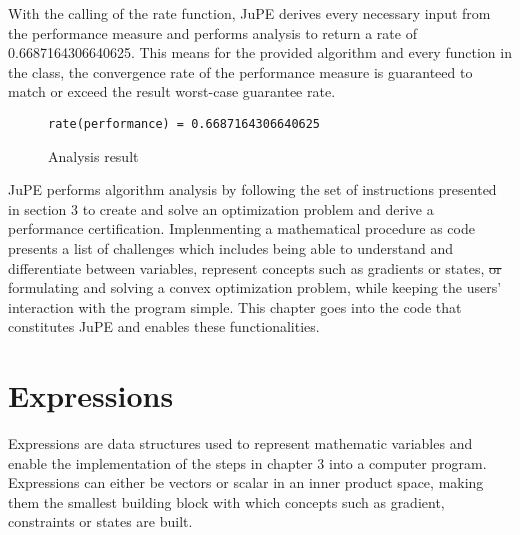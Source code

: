 With the calling of the rate function, JuPE derives every necessary input from the performance measure and performs analysis to return a rate of 0.6687164306640625. This means for the provided algorithm and every function in the class, the convergence rate of the performance measure is guaranteed to match or exceed the result worst-case guarantee rate. 
 
\begin{figure}[hbtp]
\begin{lstlisting}
rate(performance) = 0.6687164306640625
\end{lstlisting}
\caption{Analysis result}
\label{ex_result}
\end{figure}

JuPE performs algorithm analysis by following the set of instructions presented in section 3 to create and solve an optimization problem and derive a performance certification. Implenmenting a mathematical procedure as code presents a list of challenges which includes being able to understand and differentiate between variables, represent concepts such as gradients or states, \sout{or}  formulating and solving a convex optimization problem, while keeping the users' interaction with the program simple. This chapter goes into the code that constitutes JuPE and enables these functionalities.

\section{Expressions}

Expressions are data structures used to represent mathematic variables and enable the implementation of the steps in chapter 3  into a computer program. Expressions can either be vectors or scalar in an inner product space, making them the smallest building block with which concepts such as gradient, constraints\comment{,} or states are built.

